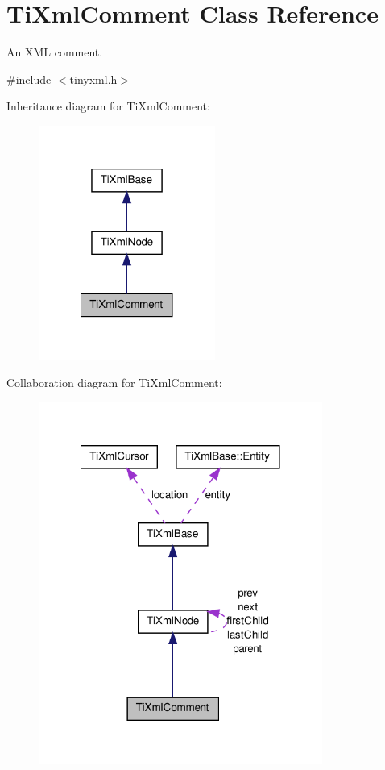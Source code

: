 \hypertarget{classTiXmlComment}{
\section{TiXmlComment Class Reference}
\label{de/d43/classTiXmlComment}
}


An XML comment.  




{\ttfamily \#include $<$tinyxml.h$>$}



Inheritance diagram for TiXmlComment:
\nopagebreak
\begin{figure}[H]
\begin{center}
\leavevmode
\includegraphics[width=164pt]{dc/ddd/classTiXmlComment__inherit__graph}
\end{center}
\end{figure}


Collaboration diagram for TiXmlComment:
\nopagebreak
\begin{figure}[H]
\begin{center}
\leavevmode
\includegraphics[width=264pt]{d4/de5/classTiXmlComment__coll__graph}
\end{center}
\end{figure}
